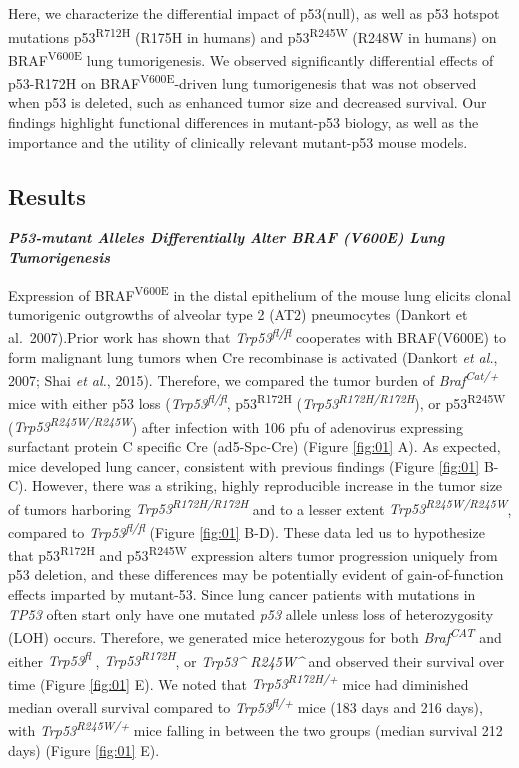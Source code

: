 Here, we characterize the differential impact of p53(null), as well as p53 hotspot mutations p53\textsuperscript{R712H} (R175H in humans) and p53\textsuperscript{R245W} (R248W in humans) on BRAF\textsuperscript{V600E} lung tumorigenesis. We observed significantly differential effects of p53-R172H on BRAF\textsuperscript{V600E}-driven lung tumorigenesis that was not observed when p53 is deleted, such as enhanced tumor size and decreased survival. Our findings highlight functional differences in mutant-p53 biology, as well as the importance and the utility of clinically relevant mutant-p53 mouse models.

\hypertarget{results}{%
\subsection{Results}\label{results}}

\emph{\textbf{P53-mutant Alleles Differentially Alter BRAF (V600E) Lung Tumorigenesis}}

Expression of BRAF\textsuperscript{V600E} in the distal epithelium of the mouse lung elicits clonal tumorigenic outgrowths of alveolar type 2 (AT2) pneumocytes (Dankort et al.~2007).Prior work has shown that \emph{Trp53\textsuperscript{fl/fl}} cooperates with BRAF(V600E) to form malignant lung tumors when Cre recombinase is activated (Dankort \emph{et al.}, 2007; Shai \emph{et al.}, 2015). Therefore, we compared the tumor burden of \emph{Braf\textsuperscript{Cat/+}} mice with either p53 loss (\emph{Trp53\textsuperscript{fl/fl}}, p53\textsuperscript{R172H} (\emph{Trp53\textsuperscript{R172H/R172H}}), or p53\textsuperscript{R245W} (\emph{Trp53\textsuperscript{R245W/R245W}}) after infection with 106 pfu of adenovirus expressing surfactant protein C specific Cre (ad5-Spc-Cre) (Figure \ref{fig:01} A). As expected, mice developed lung cancer, consistent with previous findings (Figure \ref{fig:01} B-C). However, there was a striking, highly reproducible increase in the tumor size of tumors harboring \emph{Trp53\textsuperscript{R172H/R172H}} and to a lesser extent \emph{Trp53\textsuperscript{R245W/R245W}}, compared to \emph{Trp53\textsuperscript{fl/fl}} (Figure \ref{fig:01} B-D). These data led us to hypothesize that p53\textsuperscript{R172H} and p53\textsuperscript{R245W} expression alters tumor progression uniquely from p53 deletion, and these differences may be potentially evident of gain-of-function effects imparted by mutant-53. Since lung cancer patients with mutations in \emph{TP53} often start only have one mutated \emph{p53} allele unless loss of heterozygosity (LOH) occurs. Therefore, we generated mice heterozygous for both \emph{Braf\textsuperscript{CAT}} and either \emph{Trp53\textsuperscript{fl}} , \emph{Trp53\textsuperscript{R172H}}, or \emph{Trp53\^{} R245W\^{}} and observed their survival over time (Figure \ref{fig:01} E). We noted that \emph{Trp53\textsuperscript{R172H/+}} mice had diminished median overall survival compared to \emph{Trp53\textsuperscript{fl/+}} mice (183 days and 216 days), with \emph{Trp53\textsuperscript{R245W/+}} mice falling in between the two groups (median survival 212 days) (Figure \ref{fig:01} E).

